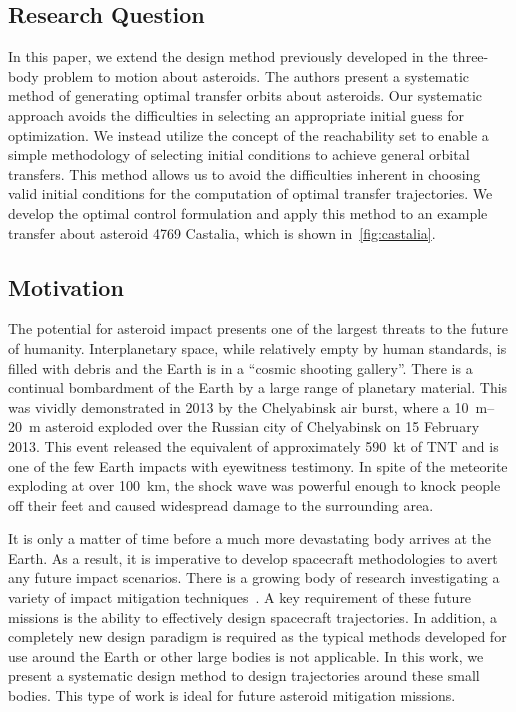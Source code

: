 \documentclass[11pt,reqno]{amsart} %
\begin{document}
\begin{multicols}{2}
\subsection{Research Question}
In this paper, we extend the design method previously developed in the three-body problem to motion about asteroids.
The authors present a systematic method of generating optimal transfer orbits about asteroids.
Our systematic approach avoids the difficulties in selecting an appropriate initial guess for optimization.
We instead utilize the concept of the reachability set to enable a simple methodology of selecting initial conditions to achieve general orbital transfers.
This method allows us to avoid the difficulties inherent in choosing valid initial conditions for the computation of optimal transfer trajectories.
We develop the optimal control formulation and apply this method to an example transfer about asteroid 4769 Castalia, which is shown in~\cref{fig:castalia}.
\subsection{Motivation}

The potential for asteroid impact presents one of the largest threats to the future of humanity.
Interplanetary space, while relatively empty by human standards, is filled with debris and the Earth is in a ``cosmic shooting gallery''.
There is a continual bombardment of the Earth by a large range of planetary material.
This was vividly demonstrated in 2013 by the Chelyabinsk air burst, where a \SIrange{10}{20}{\meter} asteroid exploded over the Russian city of Chelyabinsk on  15 February 2013.
This event released the equivalent of approximately \SI{590}{\kilo\tonne} of TNT and is one of the few Earth impacts with eyewitness testimony.
In spite of the meteorite exploding at over \SI{100}{\kilo\meter}, the shock wave was powerful enough to knock people off their feet and caused widespread damage to the surrounding area.

It is only a matter of time before a much more devastating body arrives at the Earth.
As a result, it is imperative to develop spacecraft methodologies to avert any future impact scenarios.
There is a growing body of research investigating a variety of impact mitigation techniques~\cite{wie2008,pitz2014}.
A key requirement of these future missions is the ability to effectively design spacecraft trajectories. 
In addition, a completely new design paradigm is required as the typical methods developed for use around the Earth or other large bodies is not applicable. 
In this work, we present a systematic design method to design trajectories around these small bodies. 
This type of work is ideal for future asteroid mitigation missions.


\end{multicols}
\end{document}
